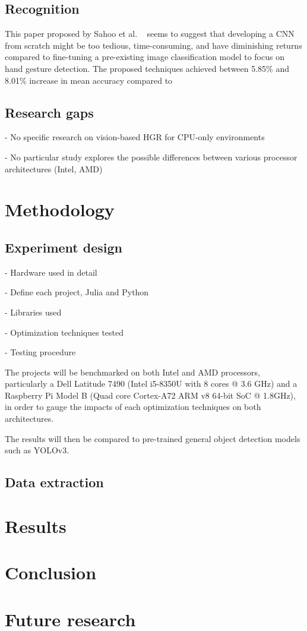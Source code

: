 \documentclass[12pt]{article}
\begin{document}
 \subsection{Recognition}

 This paper proposed by Sahoo et al. ~\cite{sahoo2022real} seems to suggest that developing a CNN from scratch might be too tedious, time-consuming, and have diminishing returns compared to fine-tuning a pre-existing image classification model to focus on hand gesture detection. The proposed techniques achieved between 5.85\% and 8.01\% increase in mean accuracy compared to 

\subsection{Research gaps}

- No specific research on vision-based HGR for CPU-only environments

- No particular study explores the possible differences between various processor architectures (Intel, AMD)

\section{Methodology}

\subsection{Experiment design}

- Hardware used in detail

- Define each project, Julia and Python

- Libraries used
 
- Optimization techniques tested

- Testing procedure

The projects will be benchmarked on both Intel and AMD processors, particularly a Dell Latitude 7490 (Intel i5-8350U with 8 cores @ 3.6 GHz) and a Raspberry Pi Model B (Quad core Cortex-A72 ARM v8 64-bit SoC @ 1.8GHz), in order to gauge the impacts of each optimization techniques on both architectures.

The results will then be compared to pre-trained general object detection models such as YOLOv3.

\subsection{Data extraction}

\section{Results}

\section{Conclusion}

\section{Future research}
\end{document}
